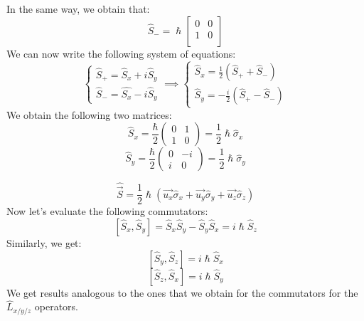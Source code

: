 \documentclass{article}
\begin{document}
In the same way, we obtain that:
$$ \hat{S}_- = \hslash \begin{bmatrix} 0 & 0 \\ 1 & 0 \\
\end{bmatrix}$$
We can now write the following system of equations: \\ 
$$
\begin{cases}
\hat{S}_+ = \hat{S}_x + i \hat{S}_y \\ 
\hat{S}_- = \hat{S_x} - i \hat{S}_y  
\end{cases} \implies \begin{cases}
\hat{S}_x = \frac{1}{2} (\hat{S}_+ + \hat{S}_-) \\ 
\hat{S}_y = -\frac{i}{2}(\hat{S}_+- \hat{S}_-) 
\end{cases} $$
We obtain the following two matrices:
$$\hat{S}_x = \frac{\hbar}{2} \begin{pmatrix} 0 & 1 \\ 1 & 0 \end{pmatrix} = \frac{1}{2} \hslash \hat{\sigma}_x$$
$$ \hat{S}_y = \frac{\hbar}{2} \begin{pmatrix} 0 & -i \\ i & 0 \end{pmatrix} =  \frac{1}{2} \hslash \hat{\sigma}_y$$

$$\hat{\Vec{S}} = \frac{1}{2}\hslash ( \Vec{u_x} \hat{\sigma}_x+ \Vec{u_y}\hat{\sigma}_y + \Vec{u_z}\hat{\sigma}_z ) $$
Now let's evaluate the following commutators:
$$ [ \hat{S}_x, \hat{S}_y ] = \hat{S}_x \hat{S}_y - \hat{S}_y\hat{S}_x= i\hslash \hat{S}_z$$
Similarly, we get:
$$[\hat{S}_y, \hat{S}_z] = i \hslash \hat{S}_x$$
$$[\hat{S}_z, \hat{S}_x] = i \hslash \hat{S}_y$$
We get results analogous to the ones that we obtain for the commutators for the $\hat{L}_{x/y/z}$ operators.
\end{document}
